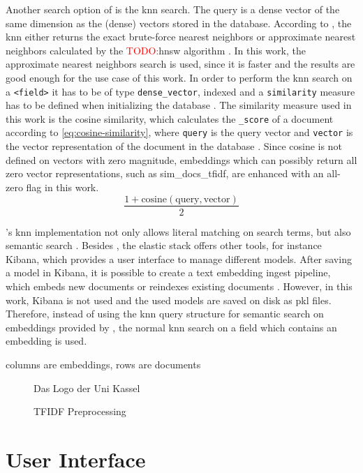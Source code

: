 Another search option of \databaseName{} is the \ac{knn} search.
The query is a dense vector of the same dimension as the (dense) vectors stored in the database.
According to \cite{Elasticsearch-knn}, the \ac{knn} either returns the exact brute-force nearest neighbors or approximate nearest neighbors calculated by the \textcolor{red}{TODO:}\ac{hnsw} algorithm \cite{Elasticsearch-kNN-HNSW, Elasticsearch-knn}.
In this work, the approximate nearest neighbors search is used, since it is faster and the results are good enough for the use case of this work.
In order to perform the \ac{knn} search on a \texttt{<field>} it has to be of type \texttt{dense\_vector}, indexed and a \texttt{similarity} measure has to be defined when initializing the database \cite{Elasticsearch-knn}.
The similarity measure used in this work is the cosine similarity, which calculates the \texttt{\_score} of a document according to \autoref{eq:cosine-similarity}, 
where \texttt{query} is the query vector and \texttt{vector} is the vector representation of the document in the database \cite{Elasticsearch-kNN-similarity}.
Since cosine is not defined on vectors with zero magnitude, embeddings which can possibly return all zero vector representations, such as sim\_docs\_tfidf, are enhanced with an all-zero flag in this work.
\begin{equation}
    \frac{1 + \text{cosine}(\text{query}, \text{vector})}{2}
\end{equation}
\label{eq:cosine-similarity}

\databaseName{}'s \ac{knn} implementation not only allows literal matching on search terms, but also semantic search \cite{Elasticsearch-knn}.
Besides \databaseName{}, the elastic stack offers other tools, for instance Kibana, which provides a user interface to manage different models.
After saving a model in Kibana, it is possible to create a text embedding ingest pipeline, which embeds new documents or reindexes existing documents \cite{Elasticsearch-knn-embedding}.
However, in this work, Kibana is not used and the used models are saved on disk as \ac{pkl} files.
Therefore, instead of using the \ac{knn} query structure for semantic search on embeddings provided by \databaseName{}, the normal \ac{knn} search on a field which contains an embedding is used.


columns are embeddings, rows are documents

\begin{figure}[htp] %
    \centering
    
    \caption{Das Logo der Uni Kassel}
    \label{fig:pdf2db}
\end{figure}

\begin{figure}[htp] %
    \centering
    
    \caption{TFIDF Preprocessing}
    \label{fig:preprocessing}
\end{figure}

\section{User Interface}\label{sec:ui}